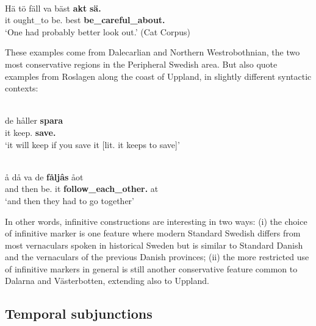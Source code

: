 \ea\label{}
\\
\gll Hä  tö  fäll  va  bäst  \textbf{akt}\textbf{  sä.}\\
it  ought\_to  {\prag}  be.{\inf}  best  \textbf{be\_careful\_about.{\inf}} \textbf{{}}\\
\glt ‘One had probably better look out.’ (Cat Corpus)
\z

These examples come from Dalecarlian and Northern Westrobothnian, the two most conservative regions in the Peripheral Swedish area. But \citet[99]{KällskogEtAl1993} also quote examples from Roslagen along the coast of Uppland, in slightly different syntactic contexts:

\ea\label{}
\\
\gll de  håller  \textbf{spara}\\
it  keep.{\prs}  \textbf{save.{\inf}}\\
\glt ‘it will keep if you save it [lit. it keeps to save]’
\z

\ea\label{}
\\
\gll å  då  va  de  \textbf{fåljâs} åot\\
and  then  be.{\pst}  it  \textbf{follow\_each\_other.{\inf}} at\\
\glt ‘and then they had to go together’ 
\z

In other words, infinitive constructions are interesting in two ways: (i) the choice of infinitive marker is one feature where modern Standard Swedish differs from most vernaculars spoken in historical Sweden but is similar to Standard Danish and the vernaculars of the previous Danish provinces; (ii) the more restricted use of infinitive markers in general is still another conservative feature common to Dalarna and Västerbotten, extending also to Uppland. 

\subsection{Temporal subjunctions}

